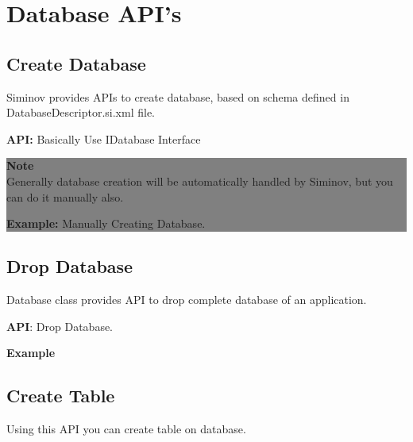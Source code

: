\section{Database API's}
	
	\subsection{Create Database}Siminov provides APIs to create database, based on schema defined in DatabaseDescriptor.si.xml file.

			\textbf{API:} Basically Use IDatabase Interface
				
		
					\begin{center}
						\colorbox{grey}{
						\parbox[t]{.8\linewidth}{
							\fontsize{11pt}{11pt}\selectfont %
							\vspace*{0.1cm} %
		
							\hfill \textbf{Note} \\
							Generally database creation will be automatically handled by Siminov, but you can do it manually also.

							\textbf{Example:} Manually Creating Database.
								

							\vspace*{0.0cm} %
						}
					}

					\end{center}


	\subsection{Drop Database}Database class provides API to drop complete database of an application.

		\textbf{API}: Drop Database.
		
		

		\textbf{Example}
		



	\subsection{Create Table}Using this API you can create table on database.

